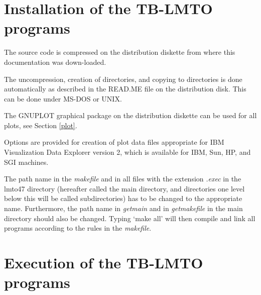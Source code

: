 \documentclass[aps,twocolumn,a4]{revtex4}
\begin{document}
\section{Installation of the TB-LMTO programs}
\label{install}
The source code is compressed on
the distribution diskette from where this documentation was down-loaded.

The uncompression, creation of directories, and copying to directories
is done automatically as described in the READ.ME file
on the distribution disk. This can be done under MS-DOS or UNIX.

The GNUPLOT graphical package on the distribution diskette can be
used for all plots, see Section \ref{plot}.

Options are provided for creation of plot data files appropriate for
IBM Visualization Data Explorer version 2, which is available for
IBM, Sun, HP, and SGI machines.

The path name in the {\em makefile} and in all files with the extension
{\em .exec} in the lmto47 directory
(hereafter called the main directory, and directories one level
below this will be called subdirectories) has to be
changed to the appropriate name. Furthermore, the path name in
{\em getmain} and in {\em getmakefile} in the main
directory should also be changed.
Typing `make all' will then compile
and link all programs according to the rules in the {\em makefile}.
%
\section{Execution of the TB-LMTO programs}
\label{execute}
\end{document}
